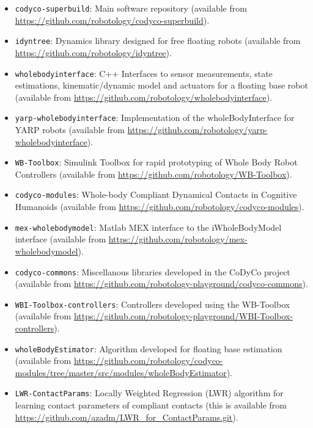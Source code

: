   \begin{itemize}
  \item \texttt{codyco-superbuild}: Main software repository (available from
    \url{https://github.com/robotology/codyco-superbuild}).
  \item \texttt{idyntree}: Dynamics library designed for free floating robots
    (available from \url{https://github.com/robotology/idyntree}).
  \item \texttt{wholebodyinterface}: C++ Interfaces to sensor measurements,
    state estimations, kinematic/dynamic model and actuators for a floating base
    robot (available from
    \url{https://github.com/robotology/wholebodyinterface}).
  \item \texttt{yarp-wholebodyinterface}: Implementation of the
    wholeBodyInterface for YARP robots (available from
    \url{https://github.com/robotology/yarp-wholebodyinterface}).
  \item \texttt{WB-Toolbox}: Simulink Toolbox for rapid prototyping of Whole
    Body Robot Controllers (available from
    \url{https://github.com/robotology/WB-Toolbox}).
  \item \texttt{codyco-modules}: Whole-body Compliant Dynamical Contacts in
    Cognitive Humanoids (available from
    \url{https://github.com/robotology/codyco-modules}).
  \item \texttt{mex-wholebodymodel}: Matlab MEX interface to the iWholeBodyModel
    interface (available from
    \url{https://github.com/robotology/mex-wholebodymodel}).
  \item \texttt{codyco-commons}: Miscellanous libraries developed in the CoDyCo
    project (available from
    \url{https://github.com/robotology-playground/codyco-commons}).
  \item \texttt{WBI-Toolbox-controllers}: Controllers developed using the
    WB-Toolbox (available from
    \url{https://github.com/robotology-playground/WBI-Toolbox-controllers}).
  \item \texttt{wholeBodyEstimator}: Algorithm developed for floating base
    estimation (available from
    \url{https://github.com/robotology/codyco-modules/tree/master/src/modules/wholeBodyEstimator}).
  \item \texttt{LWR-ContactParams}: Locally Weighted Regression (LWR) algorithm
    for learning contact parameters of compliant contacts (this is available
    from \url{https://github.com/azadm/LWR_for_ContactParams.git}).
  \end{itemize}
  

